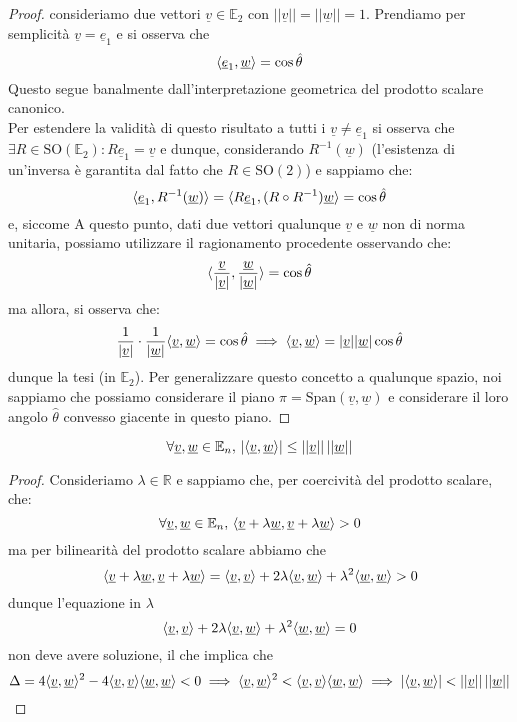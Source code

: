 \documentclass[openany, italian]{book}
\begin{document}
\begin{proof}
consideriamo due vettori $\underline{v} \in \mathbb{E}_2$ con $|| \underline{v} || = || \underline{w} || = 1$. Prendiamo per semplicità $\underline{v} = \underline{e}_1$ e si osserva che
$$
\langle \underline{e}_1, \underline{w} \rangle = \cos{\hat{\theta}}
$$
Questo segue banalmente dall'interpretazione geometrica del prodotto scalare canonico. \\
Per estendere la validità di questo risultato a tutti i $\underline{v} \neq \underline{e}_1$ si osserva che $\exists R \in \text{SO}(\mathbb{E}_2): R\underline{e}_1 = \underline{v}$ e dunque, considerando $R^{-1}(\underline{w})$ (l'esistenza di un'inversa è garantita dal fatto che $R \in \text{SO}(2)$) e sappiamo che:
$$
\langle \underline{e}_1, R^{-1}(\underline{w}) \rangle = \langle R \underline{e}_1, (R \circ R^{-1})\underline{w} \rangle = \cos{\hat{\theta}}
$$
e, siccome 
A questo punto, dati due vettori qualunque $\underline{v}$ e $\underline{w}$ non di norma unitaria, possiamo utilizzare il ragionamento procedente osservando che:
$$
\langle \frac{\underline{v}}{|\underline{v}|}, \frac{\underline{w}}{|\underline{w}|} \rangle = \cos{\hat{\theta}}
$$
ma allora, si osserva che:
$$
\frac{1}{|\underline{v}|} \cdot \frac{1}{|\underline{w}|} \langle \underline{v}, \underline{w} \rangle = \cos{\hat{\theta}} \implies \langle \underline{v},  \underline{w} \rangle = |\underline{v}| |\underline{w}| \cos{\hat{\theta}}
$$
dunque la tesi (in $\mathbb{E}_2$). Per generalizzare questo concetto a qualunque spazio, noi sappiamo che possiamo considerare il piano $\pi = \text{Span}(\underline{v}, \underline{w})$ e considerare il loro angolo $\hat{\theta}$ convesso giacente in questo piano.
\end{proof}
\begin{prop}
$$\forall \underline{v}, \underline{w} \in \mathbb{E}_n, \, | \langle \underline{v}, \underline{w} \rangle | \leq ||\underline{v}|| \, ||\underline{w}||$$
\label{prop:dis_cs}
\end{prop}
\begin{proof}
Consideriamo $\lambda \in \mathbb{R}$ e sappiamo che, per coercività del prodotto scalare, che:
$$
\forall \underline{v}, \underline{w} \in \mathbb{E}_n, \, \langle \underline{v} + \lambda \underline{w}, \underline{v} + \lambda \underline{w} \rangle > 0
$$
ma per bilinearità del prodotto scalare abbiamo che
$$
\langle \underline{v} + \lambda \underline{w}, \underline{v} + \lambda \underline{w} \rangle = \langle \underline{v}, \underline{v} \rangle + 2\lambda \langle \underline{v}, \underline{w} \rangle + \lambda^2 \langle \underline{w}, \underline{w} \rangle> 0
$$
dunque l'equazione in $\lambda$
$$
\langle \underline{v}, \underline{v} \rangle + 2\lambda \langle \underline{v}, \underline{w} \rangle + \lambda^2 \langle \underline{w}, \underline{w} \rangle = 0
$$
non deve avere soluzione, il che implica che
$$
\Delta = 4\langle \underline{v}, \underline{w} \rangle^2 - 4 \langle \underline{v}, \underline{v} \rangle \langle \underline{w}, \underline{w} \rangle < 0 \implies \langle \underline{v}, \underline{w} \rangle^2 < \langle \underline{v}, \underline{v} \rangle \langle \underline{w}, \underline{w} \rangle \implies |\langle \underline{v}, \underline{w} \rangle| < ||\underline{v}|| \, ||\underline{w}||
$$
\end{proof}
\end{document}

